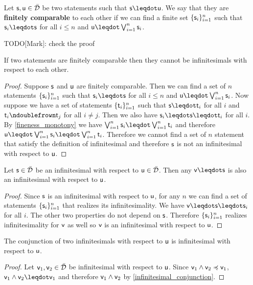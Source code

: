 \documentclass[10pt, onecolumn, longbibliography, nofootinbib]{revtex4-2}
\begin{document}
\begin{defn}
	Let $\stmt, \stmt[u] \in \tdomain$ be two statements such that $\stmt \finer \stmt[u]$. We say that they are \textbf{finitely comparable} to each other if we can find a finite set $\{ \stmt_i \}_{i=1}^n$ such that $\stmt_i \finer \stmt$ for all $i \leq n$ and $\stmt[u] \finer \bigOR_{i=1}^n \stmt_i$.
\end{defn}

TODO[Mark]: check the proof
\begin{prop}
	If two statements are finitely comparable then they cannot be infinitesimals with respect to each other.
\end{prop}
\begin{proof}
	Suppose $\stmt$ and $\stmt[u]$ are finitely comparable. Then we can find a set of $n$ statements $\{ \stmt_i \}_{i=1}^n$ such that $\stmt_i \finer \stmt$ for all $i \leq n$ and $\stmt[u] \finer \bigOR_{i=1}^n \stmt_i$. Now suppose we have a set of statements $\{ \stmt[t]_i \}_{i=1}^n$ such that $\stmt \finer \stmt[t]_i$ for all $i$ and $\stmt[t]_i \ncomp \stmt[t]_j$ for all $i \neq j$. Then we also have $\stmt_i \finer \stmt \finer \stmt[t]_i$ for all $i$. By \ref{fineness_monotony} we have $\bigOR_{i=1}^n \stmt_i \finer \bigOR_{i=1}^n \stmt[t]_i$ and therefore $\stmt[u] \finer \bigOR_{i=1}^n \stmt_i \finer \bigOR_{i=1}^n \stmt[t]_i$. Therefore we cannot find a set of $n$ statement that satisfy the definition of infinitesimal and therefore $\stmt$ is not an infinitesimal with respect to $\stmt[u]$.
\end{proof} 

\begin{prop}\label{infinitesimal_conjunction}
	Let $\stmt \in \tdomain$ be an infinitesimal with respect to $\stmt[u] \in \tdomain$. Then any $\stmt[v] \finer \stmt$ is also an infinitesimal with respect to $\stmt[u]$.
\end{prop}
\begin{proof}
	Since $\stmt$ is an infinitesimal with respect to $\stmt[u]$, for any $n$ we can find a set of statements $\{ \stmt_i \}_{i=1}^n$ that realizes its infinitesimality. We have $\stmt[v] \finer \stmt \finer \stmt_i$ for all $i$. The other two properties do not depend on $\stmt$. Therefore $\{ \stmt_i \}_{i=1}^n$ realizes infinitesimality for $\stmt[v]$ as well so $\stmt[v]$ is an infinitesimal with respect to $\stmt[u]$.
\end{proof}

\begin{coro}
	The conjunction of two infinitesimals with respect to $\stmt[u]$ is infinitesimal with respect to $\stmt[u]$.
\end{coro}
\begin{proof}
	Let $\stmt[v]_1, \stmt[v]_2 \in \tdomain$ be infinitesimal with respect to $\stmt[u]$. Since $\stmt[v]_1 \AND \stmt[v]_2 \narrower \stmt[v]_1$, $\stmt[v]_1 \AND \stmt[v]_2 \finer \stmt[v]_1$ and therefore $\stmt[v]_1 \AND \stmt[v]_2$ by \ref{infinitesimal_conjunction}.
\end{proof}
\end{document}
